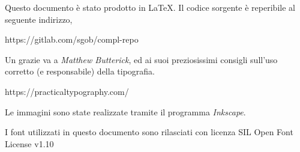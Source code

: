 \begin{titlepage}
\begin{center}
                \large
                Questo documento è stato prodotto in LaTeX. Il codice sorgente è reperibile al seguente indirizzo,

                https://gitlab.com/sgob/compl-repo

                \vspace*{5cm}

                Un grazie va a \emph{Matthew Butterick}, ed ai suoi preziosissimi consigli sull'uso corretto (e responsabile) della tipografia.

                https://practicaltypography.com/

                \vfill
                \small 

                \vspace*{1cm}

                Le immagini sono state realizzate tramite il programma \emph{Inkscape}.
                \vspace*{1cm}

                I font utilizzati in questo documento sono rilasciati con licenza SIL Open Font License v1.10
        \end{center}
\end{titlepage}

